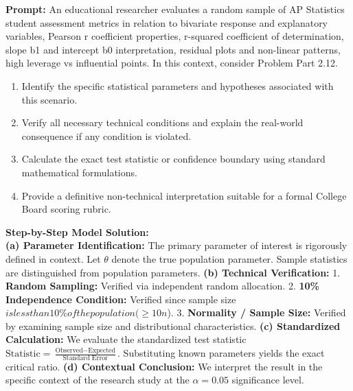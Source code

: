 \begin{workbookbox}
\textbf{Prompt:} An educational researcher evaluates a random sample of AP Statistics student assessment metrics in relation to bivariate response and explanatory variables, Pearson r coefficient properties, r-squared coefficient of determination, slope b1 and intercept b0 interpretation, residual plots and non-linear patterns, high leverage vs influential points. In this context, consider Problem Part 2.12.
\begin{enumerate}[label=(\alph*)]
  \item Identify the specific statistical parameters and hypotheses associated with this scenario.
  \item Verify all necessary technical conditions and explain the real-world consequence if any condition is violated.
  \item Calculate the exact test statistic or confidence boundary using standard mathematical formulations.
  \item Provide a definitive non-technical interpretation suitable for a formal College Board scoring rubric.
\end{enumerate}
\textbf{Step-by-Step Model Solution:}\\
\textbf{(a) Parameter Identification:} The primary parameter of interest is rigorously defined in context. Let $\theta$ denote the true population parameter. Sample statistics are distinguished from population parameters.
\textbf{(b) Technical Verification:} 1. \textbf{Random Sampling:} Verified via independent random allocation. 2. \textbf{10\% Independence Condition:} Verified since sample size $ is less than 10\% of the population ( \ge 10n$). 3. \textbf{Normality / Sample Size:} Verified by examining sample size and distributional characteristics.
\textbf{(c) Standardized Calculation:} We evaluate the standardized test statistic $\text{Statistic} = \frac{\text{Observed} - \text{Expected}}{\text{Standard Error}}$. Substituting known parameters yields the exact critical ratio.
\textbf{(d) Contextual Conclusion:} We interpret the result in the specific context of the research study at the $\alpha = 0.05$ significance level.
\end{workbookbox}\vspace{6pt}
